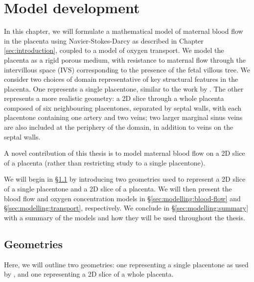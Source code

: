 \chapter{Model development} \label{sec:modelling}    
    In this chapter, we will formulate a mathematical model of maternal blood flow in the placenta using Navier-Stokes-Darcy as described in Chapter \ref{sec:introduction}, coupled to a model of oxygen transport. We model the placenta as a rigid porous medium, with resistance to maternal flow through the intervillous space (IVS) corresponding to the presence of the fetal villous tree. We consider two choices of domain representative of key structural features in the placenta. One represents a single placentone, similar to the work by \citeauthor{lecarpentierComputationalFluidDynamic2016} \cite{lecarpentierComputationalFluidDynamic2016}. The other represents a more realistic geometry: a 2D slice through a whole placenta composed of six neighbouring placentones, separated by septal walls, with each placentone containing one artery and two veins; two larger marginal sinus veins are also included at the periphery of the domain, in addition to veins on the septal walls.
    
    A novel contribution of this thesis is to model maternal blood flow on a 2D slice of a placenta (rather than restricting study to a single placentone).
    
    We will begin in \S\ref{sec:modelling:geometries} by introducing two geometries used to represent a 2D slice of a single placentone and a 2D slice of a placenta. We will then present the blood flow and oxygen concentration models in \S\ref{sec:modelling:blood-flow} and \S\ref{sec:modelling:transport}, respectively. We conclude in \S\ref{sec:modelling:summary} with a summary of the models and how they will be used throughout the thesis. 


    \section{Geometries} \label{sec:modelling:geometries}
        Here, we will outline two geometries: one representing a single placentone as used by \citeauthor{lecarpentierComputationalFluidDynamic2016} \cite{lecarpentierComputationalFluidDynamic2016}, and one representing a 2D slice of a whole placenta.
        
